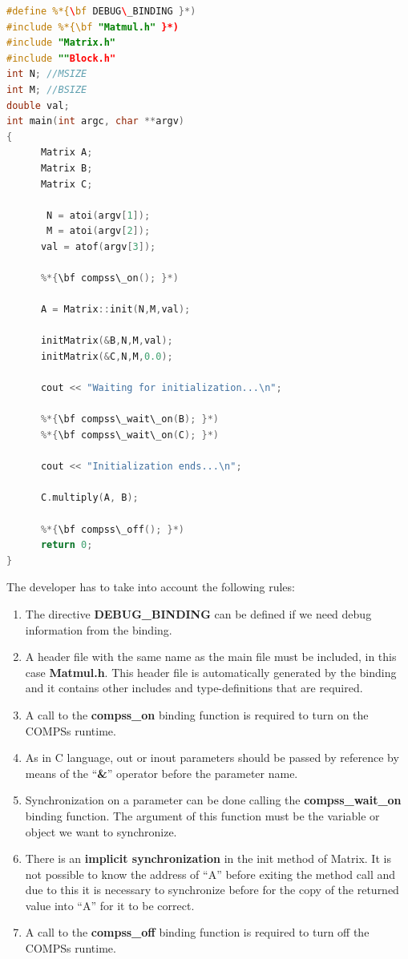 \begin{lstlisting}[language=C++]
#define %*{\bf DEBUG\_BINDING }*)
#include %*{\bf "Matmul.h" }*)
#include "Matrix.h"
#include ""Block.h"
int N; //MSIZE
int M; //BSIZE
double val;
int main(int argc, char **argv)
{
      Matrix A;
      Matrix B;
      Matrix C;

       N = atoi(argv[1]);
       M = atoi(argv[2]);
      val = atof(argv[3]);

      %*{\bf compss\_on(); }*)

      A = Matrix::init(N,M,val);

      initMatrix(&B,N,M,val);
      initMatrix(&C,N,M,0.0);

      cout << "Waiting for initialization...\n";

      %*{\bf compss\_wait\_on(B); }*)
      %*{\bf compss\_wait\_on(C); }*)

      cout << "Initialization ends...\n";
 
      C.multiply(A, B);

      %*{\bf compss\_off(); }*)
      return 0;
}
\end{lstlisting}

The developer has to take into account the following rules:
\begin{enumerate}
 \item The directive {\bf DEBUG\_BINDING} can be defined if we need debug information from the binding.
 \item A header file with the same name as the main file must be included, in this case {\bf Matmul.h}. 
       This header file is automatically generated by the binding and it contains other includes and 
        type-definitions that are required.
 \item A call to the {\bf compss\_on} binding function is required to turn on the COMPSs runtime.
 \item As in C language, out or inout parameters should be passed by reference by means of the ``{\bf \&}'' 
       operator before the parameter name.
 \item Synchronization on a parameter can be done calling the {\bf compss\_wait\_on} binding function. 
       The argument of this function must be the variable or object we want to synchronize.
 \item There is an {\bf implicit synchronization} in the init method of Matrix. It is not possible to 
       know the address of ``A'' before exiting the method call and due to this it is necessary to synchronize 
       before for the copy of the returned value into ``A'' for it to be correct.
 \item A call to the {\bf compss\_off} binding function is required to turn off the COMPSs runtime.
\end{enumerate}


